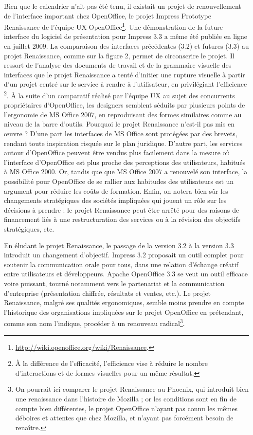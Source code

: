 \documentclass{FramateX}
\begin{document}
\begin{refsection}
Bien que le calendrier n'ait pas été tenu, il existait un projet de
renouvellement de l'interface important chez OpenOffice, le projet
Impress Prototype Renaissance de l'équipe UX
OpenOffice\footnote{\url{http://wiki.openoffice.org/wiki/Renaissance}.}. Une démonstration de la future interface du logiciel de présentation
pour Impress 3.3 a même été publiée en ligne en juillet 2009. La
comparaison des interfaces précédentes (3.2) et futures (3.3) au projet
Renaissance, comme sur la figure 2, permet de circonscrire le projet.
Il ressort de l'analyse des documents de travail et de la grammaire
visuelle des interfaces que le projet Renaissance a tenté d'initier une
rupture visuelle à partir d'un projet centré sur le service à rendre à
l'utilisateur, en privilégiant l'efficience \footnote{À la différence de l'efficacité,
l'efficience vise à réduire le nombre d'interactions et de formes
visuelles pour un même résultat.}. À la suite d'un comparatif réalisé
par l'équipe UX au sujet des concurrents propriétaires
d'OpenOffice, les designers semblent séduits par plusieurs points de
l'ergonomie de MS Office 2007, en reproduisant des formes similaires
comme au niveau de la barre d'outils. Pourquoi le projet Renaissance
n'est-il pas mis en œuvre ? D'une part les interfaces de MS Office sont
protégées par des brevets, rendant toute inspiration risquée sur le
plan juridique. D'autre part, les services autour d'OpenOffice peuvent
être vendus plus facilement dans la mesure où l'interface d'OpenOffice
est plus proche des perceptions des utilisateurs, habitués à MS Office
2000. Or, tandis que que MS Office 2007 a renouvelé son interface, la
possibilité pour OpenOffice de se rallier aux habitudes des
utilisateurs est un argument pour réduire les coûts de formation.
Enfin, on notera bien sûr les changements stratégiques des sociétés
impliquées qui jouent un rôle sur les décisions à prendre : le projet
Renaissance peut être arrêté pour des raisons de financement liés à une
restructuration des services ou à la révision des objectifs
stratégiques, etc. 

En éludant le projet Renaissance, le passage de la version 3.2 à la
version 3.3 introduit un changement d'objectif. Impress 3.2 proposait
un outil complet pour soutenir la communication orale pour tous, dans
une relation d'échange créatif entre utilisateurs et développeurs.
Apache OpenOffice 3.3 se veut un outil efficace voire puissant, tourné
notamment vers le partenariat et la communication d'entreprise
(présentation chiffrée, résultats et ventes, etc.). Le projet
Renaissance, malgré ses qualités ergonomiques, semble moins prendre en
compte l'historique des organisations impliquées sur le projet
OpenOffice en prétendant, comme son nom l'indique, procéder à un
renouveau radical\footnote{On pourrait ici
comparer le projet Renaissance au Phoenix, qui introduit bien une
renaissance dans l'histoire de Mozilla ; or les conditions sont en fin
de compte bien différentes, le projet OpenOffice n'ayant pas connu les
mêmes déboires et attentes que chez Mozilla, et n'ayant pas forcément
besoin de renaître.}. 


\end{refsection}
\end{document}
